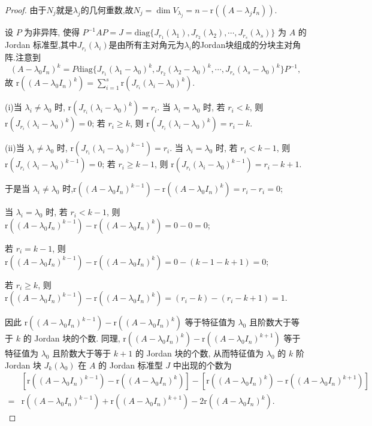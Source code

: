 \documentclass[../../main.tex]{subfiles}
\begin{document}
\begin{proof}
由于$N_j$就是$\lambda_j$的几何重数,故$N_j=\dim V_{\lambda_j}=n-\mathrm{r}((A - \lambda_j I_n))$.

设 $P$ 为非异阵, 使得 $P^{-1}AP = J = \mathrm{diag}\{J_{r_1}(\lambda_1),J_{r_2}(\lambda_2),\cdots,J_{r_s}(\lambda_s)\}$ 为 $A$ 的 Jordan 标准型,其中$J_{r_i}(\lambda_i)$是由所有主对角元为$\lambda_i$的Jordan块组成的分块主对角阵.注意到
\[
(A - \lambda_0 I_n)^k = P\mathrm{diag}\{J_{r_1}(\lambda_1 - \lambda_0)^k,J_{r_2}(\lambda_2 - \lambda_0)^k,\cdots,J_{r_s}(\lambda_s - \lambda_0)^k\}P^{-1},
\]
故 $\mathrm{r}((A - \lambda_0 I_n)^k) = \sum_{i = 1}^{s}\mathrm{r}(J_{r_i}(\lambda_i - \lambda_0)^k)$.

(i)当 $\lambda_i \neq \lambda_0$ 时, $\mathrm{r}(J_{r_i}(\lambda_i - \lambda_0)^k) = r_i$. 
当 $\lambda_i = \lambda_0$ 时, 
若 $r_i < k$, 则 $\mathrm{r}(J_{r_i}(\lambda_i - \lambda_0)^k) = 0$; 
若 $r_i \geqslant  k$, 则 $\mathrm{r}(J_{r_i}(\lambda_i - \lambda_0)^k) = r_i - k$. 

(ii)当 $\lambda_i \neq \lambda_0$ 时, $\mathrm{r}(J_{r_i}(\lambda_i - \lambda_0)^{k-1}) = r_i$. 
当 $\lambda_i = \lambda_0$ 时, 
若 $r_i < k-1$, 则 $\mathrm{r}(J_{r_i}(\lambda_i - \lambda_0)^{k-1}) = 0$; 
若 $r_i \geqslant  k-1$, 则 $\mathrm{r}(J_{r_i}(\lambda_i - \lambda_0)^{k-1}) = r_i - k+1$. 

于是当 $\lambda_i \neq \lambda_0$ 时,$\mathrm{r}((A - \lambda_0 I_n)^{k - 1}) - \mathrm{r}((A - \lambda_0 I_n)^k)=r_i-r_i=0$;

当 $\lambda_i = \lambda_0$ 时, 
若 $r_i < k-1$, 则$\mathrm{r}((A - \lambda_0 I_n)^{k - 1}) - \mathrm{r}((A - \lambda_0 I_n)^k)=0-0=0$;

若 $r_i =k-1$, 则$\mathrm{r}((A - \lambda_0 I_n)^{k - 1}) - \mathrm{r}((A - \lambda_0 I_n)^k)=0-(k-1-k+1)=0$;

若 $r_i \geqslant  k$, 则$\mathrm{r}((A - \lambda_0 I_n)^{k - 1}) - \mathrm{r}((A - \lambda_0 I_n)^k)=(r_i-k)-(r_i-k+1)=1$.

因此 $\mathrm{r}((A - \lambda_0 I_n)^{k - 1}) - \mathrm{r}((A - \lambda_0 I_n)^k)$ 等于特征值为 $\lambda_0$ 且阶数大于等于 $k$ 的 Jordan 块的个数. 同理, $\mathrm{r}((A - \lambda_0 I_n)^k) - \mathrm{r}((A - \lambda_0 I_n)^{k + 1})$ 等于特征值为 $\lambda_0$ 且阶数大于等于 $k + 1$ 的 Jordan 块的个数, 从而特征值为 $\lambda_0$ 的 $k$ 阶 Jordan 块 $J_k(\lambda_0)$ 在 $A$ 的 Jordan 标准型 $J$ 中出现的个数为
\begin{align*}
&[\mathrm{r}((A - \lambda_0 I_n)^{k - 1}) - \mathrm{r}((A - \lambda_0 I_n)^k)] - [\mathrm{r}((A - \lambda_0 I_n)^k) - \mathrm{r}((A - \lambda_0 I_n)^{k + 1})]\\
=&\mathrm{r}((A - \lambda_0 I_n)^{k - 1}) + \mathrm{r}((A - \lambda_0 I_n)^{k + 1}) - 2\mathrm{r}((A - \lambda_0 I_n)^k). 
\end{align*}

\end{proof}
\end{document}
